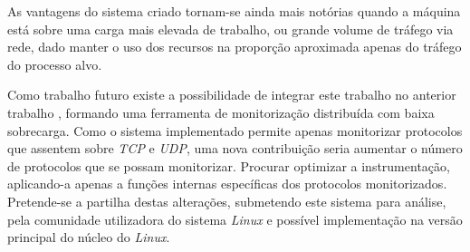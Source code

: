 \documentclass[a4paper]{llncs}
\begin{document}
As vantagens do sistema criado tornam-se ainda mais notórias quando a máquina está sobre uma carga mais elevada de trabalho, ou grande volume de tráfego via rede, dado manter o uso dos recursos na proporção aproximada apenas do tráfego do processo alvo.

Como trabalho futuro existe a possibilidade de integrar este trabalho no anterior trabalho \cite{Farruca:2009,duarte10}, formando uma ferramenta de monitorização distribuída com baixa sobrecarga.
 Como o sistema implementado permite apenas monitorizar protocolos que assentem sobre \textit{TCP} e \textit{UDP}, uma nova contribuição seria aumentar o número de protocolos que se possam monitorizar.
 Procurar optimizar a instrumentação, aplicando-a apenas a funções internas específicas dos protocolos monitorizados.
 Pretende-se a partilha destas alterações, submetendo este sistema para análise, pela comunidade utilizadora do sistema \textit{Linux} e possível implementação na versão principal do núcleo do \textit{Linux}.




\end{document}
